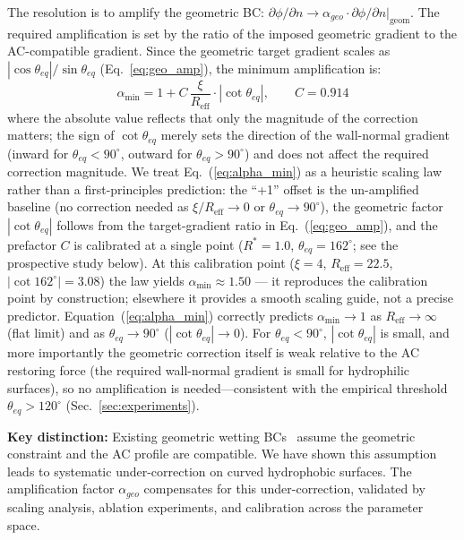 The resolution is to amplify the geometric BC: $\partial\phi/\partial n \to \alpha_{geo} \cdot \partial\phi/\partial n|_\mathrm{geom}$. The required amplification is set by the ratio of the imposed geometric gradient to the AC-compatible gradient. Since the geometric target gradient scales as $|\cos\theta_{eq}|/\sin\theta_{eq}$ (Eq.~\ref{eq:geo_amp}), the minimum amplification is:
\begin{equation}\label{eq:alpha_min}
    \alpha_\mathrm{min} = 1 + C\,\frac{\xi}{R_\mathrm{eff}} \cdot |\cot\theta_{eq}|, \qquad C = 0.914
\end{equation}
where the absolute value reflects that only the magnitude of the correction matters; the sign of $\cot\theta_{eq}$ merely sets the direction of the wall-normal gradient (inward for $\theta_{eq}<90^\circ$, outward for $\theta_{eq}>90^\circ$) and does not affect the required correction magnitude. We treat Eq.~(\ref{eq:alpha_min}) as a heuristic scaling law rather than a first-principles prediction: the ``+1'' offset is the un-amplified baseline (no correction needed as $\xi/R_\mathrm{eff}\to 0$ or $\theta_{eq}\to 90^\circ$), the geometric factor $|\cot\theta_{eq}|$ follows from the target-gradient ratio in Eq.~(\ref{eq:geo_amp}), and the prefactor $C$ is calibrated at a single point ($R^*=1.0$, $\theta_{eq}=162^\circ$; see the prospective study below). At this calibration point ($\xi = 4$, $R_\mathrm{eff} = 22.5$, $|\cot 162^\circ| = 3.08$) the law yields $\alpha_\mathrm{min} \approx 1.50$ — it reproduces the calibration point by construction; elsewhere it provides a smooth scaling guide, not a precise predictor. Equation~(\ref{eq:alpha_min}) correctly predicts $\alpha_\mathrm{min} \to 1$ as $R_\mathrm{eff} \to \infty$ (flat limit) and as $\theta_{eq} \to 90^\circ$ ($|\cot\theta_{eq}| \to 0$). For $\theta_{eq} < 90^\circ$, $|\cot\theta_{eq}|$ is small, and more importantly the geometric correction itself is weak relative to the AC restoring force (the required wall-normal gradient is small for hydrophilic surfaces), so no amplification is needed---consistent with the empirical threshold $\theta_{eq} > 120^\circ$ (Sec.~\ref{sec:experiments}).

\textbf{Key distinction:} Existing geometric wetting BCs~\cite{fakhari2017diffuse,huang2022simplified,zhang2022wetting} assume the geometric constraint and the AC profile are compatible. We have shown this assumption leads to systematic under-correction on curved hydrophobic surfaces. The amplification factor $\alpha_{geo}$ compensates for this under-correction, validated by scaling analysis, ablation experiments, and calibration across the parameter space.

